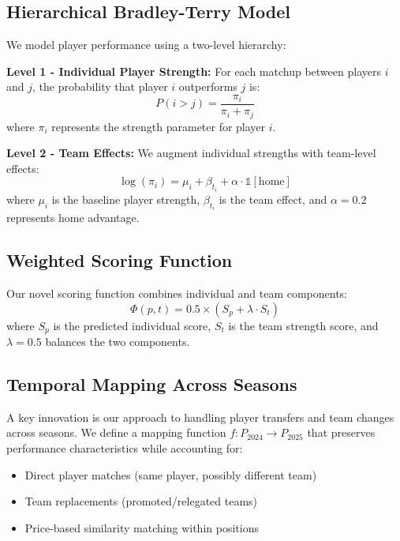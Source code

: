\documentclass[12pt]{article}
\begin{document}
\subsection{Hierarchical Bradley-Terry Model}

We model player performance using a two-level hierarchy:

\textbf{Level 1 - Individual Player Strength:}
For each matchup between players $i$ and $j$, the probability that player $i$ outperforms $j$ is:
\begin{equation}
P(i > j) = \frac{\pi_i}{\pi_i + \pi_j}
\end{equation}
where $\pi_i$ represents the strength parameter for player $i$.

\textbf{Level 2 - Team Effects:}
We augment individual strengths with team-level effects:
\begin{equation}
\log(\pi_i) = \mu_i + \beta_{t_i} + \alpha \cdot \mathbb{1}[\text{home}]
\end{equation}
where $\mu_i$ is the baseline player strength, $\beta_{t_i}$ is the team effect, and $\alpha = 0.2$ represents home advantage.

\subsection{Weighted Scoring Function}

Our novel scoring function combines individual and team components:
\begin{equation}
\Phi(p,t) = 0.5 \times (S_p + \lambda \cdot S_t)
\end{equation}
where $S_p$ is the predicted individual score, $S_t$ is the team strength score, and $\lambda = 0.5$ balances the two components.

\subsection{Temporal Mapping Across Seasons}

A key innovation is our approach to handling player transfers and team changes across seasons. We define a mapping function $f: P_{2024} \rightarrow P_{2025}$ that preserves performance characteristics while accounting for:
\begin{itemize}
\item Direct player matches (same player, possibly different team)
\item Team replacements (promoted/relegated teams)
\item Price-based similarity matching within positions
\end{itemize}
\end{document}

